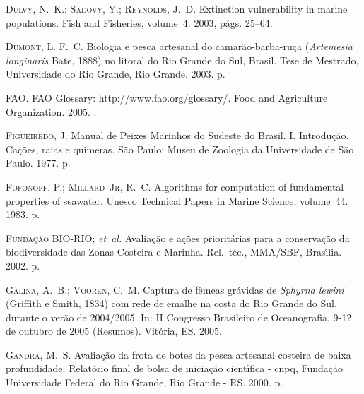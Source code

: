 \documentclass[a4paper,11pt,twoside,showtrims,onecolumn,openright,final]{memoir}
\begin{document}
\begin{thebibliography}{194}
\textsc{Dulvy, N.~K.; Sadovy, Y.; Reynolds, J.~D.}
\newblock Extinction vulnerability in marine populations.
\newblock Fish and Fisheries, volume~4. 2003, p\'ags. 25--64.

\textsc{Dumont, L. F.~C.}
\newblock Biologia e pesca artesanal do camar\~ao-barba-ru\c{c}a (\emph{{A}rtemesia
  longinaris} {B}ate, 1888) no litoral do {R}io {G}rande do {S}ul, {B}rasil.
\newblock Tese de Mestrado, Universidade do Rio Grande, Rio Grande. 2003.
 p.

\textsc{FAO}.
\newblock F{AO} {G}lossary: http://www.fao.org/glossary/.
\newblock Food and Agriculture Organization. 2005.
.

\textsc{Figueiredo, J.}
\newblock Manual de {P}eixes {M}arinhos do {S}udeste do {B}rasil. {I}.
  {I}ntrodu\c{c}\~ao. {C}a\c{c}\~oes, raias e quimeras.
\newblock S\~ao Paulo: Museu de Zoologia da Universidade de S\~ao Paulo. 1977.
 p.

\textsc{Fofonoff, P.; Millard~Jr, R.~C.}
\newblock Algorithms for computation of fundamental properties of seawater.
\newblock Unesco Technical Papers in Marine Science, volume~44. 1983.
 p.

\textsc{{Funda\c{c}\~ao BIO-RIO};} \emph{et~al.}
\newblock Avalia\c{c}\~ao e a\c{c}\~oes priorit\'arias para a conserva\c{c}\~ao
  da biodiversidade das {Z}onas {C}osteira e {M}arinha.
\newblock Rel.\ t\'ec., MMA/SBF, Bras\'{\i}lia. 2002.
 p.

\textsc{Galina, A.~B.; Vooren, C.~M.}
\newblock Captura de f\^emeas gr\'avidas de \emph{{S}phyrna lewini} ({G}riffith e
  {S}mith, 1834) com rede de emalhe na costa do {R}io {G}rande do {S}ul,
  durante o ver\~ao de 2004/2005.
\newblock In: I{I} {C}ongresso {B}rasileiro de {O}ceanografia, 9-12 de outubro
  de 2005 ({R}esumos). Vit\'oria, ES. 2005.

\textsc{Gandra, M.~S.}
\newblock Avalia\c{c}\~ao da frota de botes da pesca artesanal costeira de
  baixa profundidade.
\newblock Relat\'orio final de bolsa de inicia\c{c}\~ao cient\'{\i}fica - cnpq,
  Funda\c{c}\~ao Universidade Federal do Rio Grande, Rio Grande - RS. 2000.
 p.


\end{thebibliography}
\end{document}
